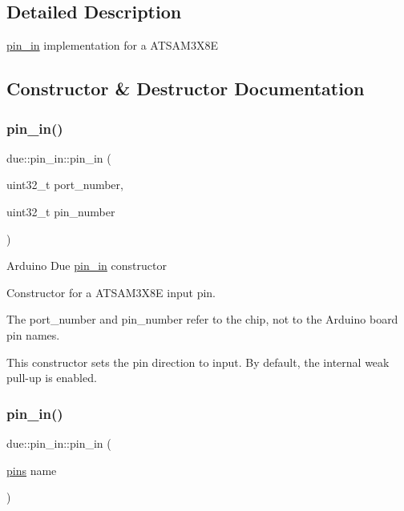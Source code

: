\subsection{Detailed Description}
\hyperlink{classdue_1_1pin__in}{pin\+\_\+in} implementation for a A\+T\+S\+A\+M3\+X8E 

\subsection{Constructor \& Destructor Documentation}
\mbox{\label{classdue_1_1pin__in_a5c42406ed2241133b3dfa3bbd73083b2}} 
\subsubsection{\texorpdfstring{pin\+\_\+in()}{pin\_in()}\hspace{0.1cm}{\footnotesize\ttfamily [1/2]}}
{\footnotesize\ttfamily due\+::pin\+\_\+in\+::pin\+\_\+in (\begin{DoxyParamCaption}\item[{uint32\+\_\+t}]{port\+\_\+number,  }\item[{uint32\+\_\+t}]{pin\+\_\+number }\end{DoxyParamCaption})\hspace{0.3cm}{\ttfamily [inline]}}

Arduino Due \hyperlink{classdue_1_1pin__in}{pin\+\_\+in} constructor

Constructor for a A\+T\+S\+A\+M3\+X8E input pin.

The port\+\_\+number and pin\+\_\+number refer to the chip, not to the Arduino board pin names.

This constructor sets the pin direction to input. By default, the internal weak pull-\/up is enabled. \mbox{\label{classdue_1_1pin__in_a91f66ca279e18ced46cf693bcf3c0935}} 
\subsubsection{\texorpdfstring{pin\+\_\+in()}{pin\_in()}\hspace{0.1cm}{\footnotesize\ttfamily [2/2]}}
{\footnotesize\ttfamily due\+::pin\+\_\+in\+::pin\+\_\+in (\begin{DoxyParamCaption}\item[{\hyperlink{namespacedue_a8ffa3ec309934ff9db34317e504bcc92}{pins}}]{name }\end{DoxyParamCaption})\hspace{0.3cm}{\ttfamily [inline]}}

